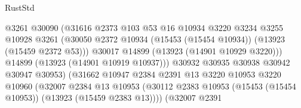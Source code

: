 \begin{lexlean}{RustStd}
\begin{coremodule}
                                            @3261
                                            @30090
                                            (@31616
                                              @2373
                                              @103
                                              @53
                                              @16
                                              @10934
                                              @3220
                                              @3234
                                              @3255
                                              @10928
                                              @3261
                                              (@30050
                                                @2372
                                                @10934
                                                (@15453 (@15454 @10934))
                                                (@13923 (@15459 @2372 @53)))
                                              @30017
                                              @14899
                                              (@13923 (@14901 @10929 @3220)))
                                            @14899
                                            (@13923 (@14901 @10919 @10937)))
                                          @30932
                                          @30935
                                          @30938
                                          @30942
                                          @30947
                                          @30953)
                                        (@31662
                                          @10947
                                          @2384
                                          @2391
                                          @13
                                          @3220
                                          @10953
                                          @3220
                                          @10960
                                          (@32007
                                            @2384
                                            @13
                                            @10953
                                            (@30112
                                              @2383
                                              @10953
                                              (@15453 (@15454 @10953))
                                              (@13923 (@15459 @2383 @13))))
                                          (@32007
                                            @2391

\end{coremodule}
\end{lexlean}
